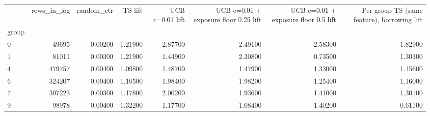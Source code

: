 \begin{tabular}{lrrrrrrr}
\toprule
 & rows\_in\_log & random\_ctr & TS lift & UCB c=0.01 lift & UCB c=0.01 + exposure floor 0.25 lift & UCB c=0.01 + exposure floor 0.5 lift & Per group TS (same feature), borrowing lift \\
group &  &  &  &  &  &  &  \\
\midrule
0 & 49695 & 0.00200 & 1.21900 & 2.87700 & 2.49100 & 2.58300 & 1.82900 \\
1 & 81011 & 0.00300 & 1.21900 & 1.44900 & 2.30800 & 0.73500 & 1.30300 \\
4 & 479757 & 0.00400 & 1.09800 & 1.48700 & 1.47900 & 1.33000 & 1.15600 \\
6 & 324207 & 0.00400 & 1.10500 & 1.98400 & 1.98200 & 1.25400 & 1.16000 \\
7 & 307223 & 0.00300 & 1.17800 & 2.00200 & 1.93600 & 1.41000 & 1.30100 \\
9 & 98978 & 0.00400 & 1.32200 & 1.17700 & 1.08400 & 1.40200 & 0.61100 \\
\bottomrule
\end{tabular}
